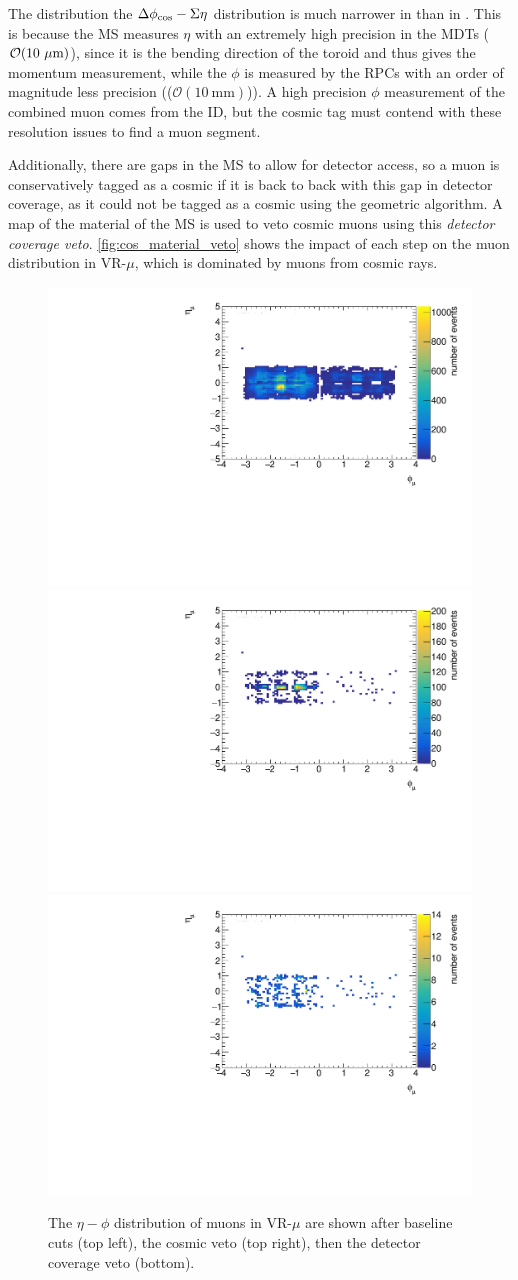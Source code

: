 The distribution the $\Delta \phi_{\text{cos}}-\Sigma \eta$ distribution is much narrower in \sigeta than in \dphicos. This is because the \ac{MS} measures $\eta$ with an extremely high precision in the \acp{MDT} ($\mathcal{O}(10~\mu\text{m})$), since it is the bending direction of the toroid and thus gives the momentum measurement, while the $\phi$ is measured by the \acp{RPC} with an order of magnitude less precision (($\mathcal{O}(10~\text{mm})$)). A high precision $\phi$ measurement of the combined muon comes from the \ac{ID}, but the cosmic tag must contend with these resolution issues to find a muon segment.

Additionally, there are gaps in the \ac{MS} to allow for detector access, so a muon is conservatively tagged as a cosmic if it is back to back with this gap in detector coverage, as it could not be tagged as a cosmic using the geometric algorithm. A map of the material of the \ac{MS} is used to veto cosmic muons using this \emph{detector coverage veto}. \autoref{fig:cos_material_veto} shows the impact of each step on the muon distribution in VR-$\mu$, which is dominated by muons from cosmic rays.


\begin{figure}[htbp]
\centering
\includegraphics[width=.48\textwidth]{figures/cosmics/v4_widetag_2_eta_phi_baseline.pdf}
\includegraphics[width=.48\textwidth]{figures/cosmics/v4_widetag_2_eta_phi_costag.pdf}
\includegraphics[width=.48\textwidth]{figures/cosmics/v4_widetag_2_eta_phi_costag_mv.pdf}
\caption{The $\eta-\phi$ distribution of muons in VR-$\mu$ are shown after baseline cuts (top left), the cosmic veto (top right), then the detector coverage veto (bottom).}
\label{fig:cos_material_veto}
\end{figure}

